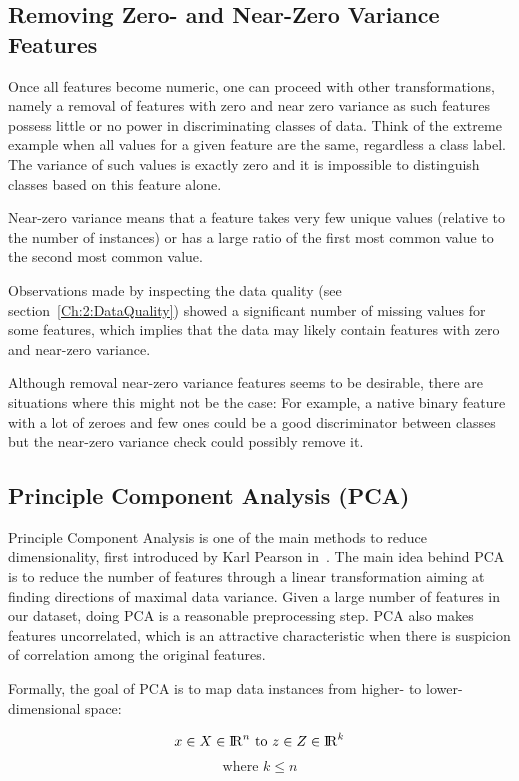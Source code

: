 \subsection{Removing Zero- and Near-Zero Variance Features}\label{Ch:2:RNZVF}
Once all features become numeric, one can proceed with other transformations, namely a removal of features with zero and near zero variance as such features possess little or no power in discriminating classes of data. Think of the extreme example when all values for a given feature are the same, regardless a class label. The variance of such values is exactly zero and it is impossible to distinguish classes based on this feature alone.

Near-zero variance means that a feature takes very few unique values (relative to the number of instances) or has a large ratio of the first most common value to the second most common value.

Observations made by inspecting the data quality (see section~\ref{Ch:2:DataQuality}) showed a significant number of missing values for some features, which implies that the data may likely contain features with zero and near-zero variance.

Although removal near-zero variance features seems to be desirable, there are situations where this might not be the case: For example, a native binary feature with a lot of zeroes and few ones could be a good discriminator between classes but the near-zero variance check could possibly remove it.

\subsection{Principle Component Analysis (PCA)}\label{Ch:2:PCA} 
Principle Component Analysis is one of the main methods to reduce dimensionality, first introduced by Karl Pearson in~\cite{Pearson:1901}. The main idea behind PCA is to reduce the number of features through a linear transformation aiming at finding directions of maximal data variance. Given a large number of features in our dataset, doing PCA is a reasonable preprocessing step. PCA also makes features uncorrelated, which is an attractive characteristic when there is suspicion of correlation among the original features.

Formally, the goal of PCA is to map data instances from higher- to lower-dimensional space:

\[ x \in X \in {\rm I\!R}^n \textrm{ to } z \in Z \in {\rm I\!R}^k \]
\[ \textrm{where } k \leq n \]

